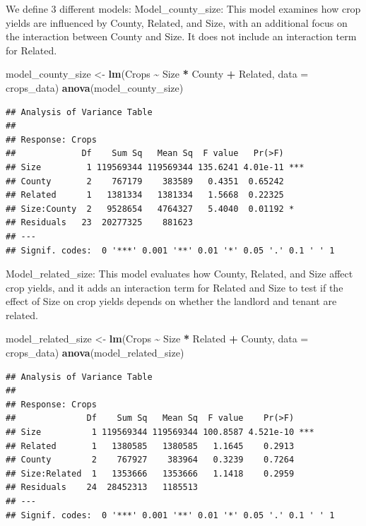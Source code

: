 \documentclass[
  11pt,
]{article}
\newenvironment{Shaded}{\begin{snugshade}}{\end{snugshade}}
\newcommand{\AttributeTok}[1]{\textcolor[rgb]{0.13,0.29,0.53}{#1}}
\newcommand{\FunctionTok}[1]{\textcolor[rgb]{0.13,0.29,0.53}{\textbf{#1}}}
\newcommand{\NormalTok}[1]{#1}
\newcommand{\OtherTok}[1]{\textcolor[rgb]{0.56,0.35,0.01}{#1}}
\newcommand{\SpecialCharTok}[1]{\textcolor[rgb]{0.81,0.36,0.00}{\textbf{#1}}}
\begin{document}
We define 3 different models: Model\_county\_size: This model examines
how crop yields are influenced by County, Related, and Size, with an
additional focus on the interaction between County and Size. It does not
include an interaction term for Related.

\begin{Shaded}
\begin{Highlighting}[]
\NormalTok{model\_county\_size }\OtherTok{\textless{}{-}} \FunctionTok{lm}\NormalTok{(Crops }\SpecialCharTok{\textasciitilde{}}\NormalTok{ Size }\SpecialCharTok{*}\NormalTok{ County }\SpecialCharTok{+}\NormalTok{ Related, }\AttributeTok{data =}\NormalTok{ crops\_data)}
\FunctionTok{anova}\NormalTok{(model\_county\_size)}
\end{Highlighting}
\end{Shaded}

\begin{verbatim}
## Analysis of Variance Table
## 
## Response: Crops
##             Df    Sum Sq   Mean Sq  F value   Pr(>F)    
## Size         1 119569344 119569344 135.6241 4.01e-11 ***
## County       2    767179    383589   0.4351  0.65242    
## Related      1   1381334   1381334   1.5668  0.22325    
## Size:County  2   9528654   4764327   5.4040  0.01192 *  
## Residuals   23  20277325    881623                      
## ---
## Signif. codes:  0 '***' 0.001 '**' 0.01 '*' 0.05 '.' 0.1 ' ' 1
\end{verbatim}

Model\_related\_size: This model evaluates how County, Related, and Size
affect crop yields, and it adds an interaction term for Related and Size
to test if the effect of Size on crop yields depends on whether the
landlord and tenant are related.

\begin{Shaded}
\begin{Highlighting}[]
\NormalTok{model\_related\_size }\OtherTok{\textless{}{-}} \FunctionTok{lm}\NormalTok{(Crops }\SpecialCharTok{\textasciitilde{}}\NormalTok{ Size }\SpecialCharTok{*}\NormalTok{ Related }\SpecialCharTok{+}\NormalTok{ County, }\AttributeTok{data =}\NormalTok{ crops\_data)}
\FunctionTok{anova}\NormalTok{(model\_related\_size)}
\end{Highlighting}
\end{Shaded}

\begin{verbatim}
## Analysis of Variance Table
## 
## Response: Crops
##              Df    Sum Sq   Mean Sq  F value    Pr(>F)    
## Size          1 119569344 119569344 100.8587 4.521e-10 ***
## Related       1   1380585   1380585   1.1645    0.2913    
## County        2    767927    383964   0.3239    0.7264    
## Size:Related  1   1353666   1353666   1.1418    0.2959    
## Residuals    24  28452313   1185513                       
## ---
## Signif. codes:  0 '***' 0.001 '**' 0.01 '*' 0.05 '.' 0.1 ' ' 1
\end{verbatim}
\end{document}
